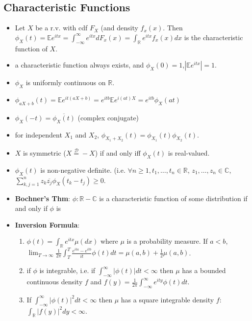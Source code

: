 \documentclass[11pt]{article}
\newcommand{\bbr}{\mathbb{R}}
\newcommand{\gf}{\phi}
\newcommand\abs[1]{\left|#1\right|}
\renewcommand{\to}{\longrightarrow}
\newcommand{\eqd}{\overset{\mathcal{D}}{=}}
\newcommand{\E}{\mathbb{E}}
\newcommand{\gm}{\mu}
\begin{document}
\begin{multicols}{2}
\subsection{Characteristic Functions}
\begin{itemize}
\item Let $X$ be a r.v. with cdf $F_{X}$ (and density $f_x(x)$.  Then $\gf_{X}(t)=\E e^{itx}=\int_{-\infty}^\infty e^{itx} dF_x(x)=\int_{\bbr}e^{itx}f_x(x)dx$ is the characteristic function of $X$.
\item a characteristic function always exists, and $\gf_X(0)=1$,$\abs{ \E e^{itx}}=1$.
\item $\gf_X$ is uniformly continuous on $\bbr$.
\item $\gf_{aX+b}(t) = \E e^{it(aX+b)} = e^{itb} \E e^{i(at)X} = e^{itb} \gf_X(at)$
\item $\gf_X(-t) = \overline{\gf_{X}(t)}$ (complex conjugate)
\item for independent $X_1$ and $X_2$, $\gf_{X_1+X_2}(t)=\gf_{X_1}(t) \gf_{X_2}(t)$.
\item $X$ is symmetric ($X \eqd -X$) if and only iff $\gf_X(t)$ is real-valued.
\item $\gf_X(t)$ is non-negative definite. (i.e. $\forall n \geq 1, t_1, \ldots, t_n \in \bbr$, $z_1, \ldots, z_n \in \mathbb{C}$, $\sum_{k,j=1}^n z_k\overline{z_j} \gf_X(t_k-t_j) \geq 0$.
\item \textbf{Bochner's Thm}: $\gf: \bbr - \mathbb{C}$ is a characteristic function of some distribution if and only if $\gf$ is 
\item \textbf{Inversion Formula}:
\begin{enumerate}
\item $\gf(t) = \int_\bbr e^{itx} \mu(dx)$ where $\mu$ is a probability measure.  If $a<b$, $\lim_{T \to \infty} \frac{1}{2\pi} \int_{T}^T \frac{e^{ita}-e^{itb}}{it}\gf(t)dt = \mu(a,b)+\frac{1}{2}\gm({a,b})$.
\item if $\gf$ is integrable, i.e. if $\int_{-\infty}^\infty \abs{\gf(t)}dt < \infty$ then $\gm$ has a bounded continuous density $f$ and $f(y)=\frac{1}{2 \pi} \int_{-\infty}^\infty e^{ity}\gf(t) dt$.
\item If $\int_{-\infty}^\infty \abs{\gf(t)}^2 dt < \infty$ then $\gm$ has a square integrable density $f$: $\int_\bbr \abs{f(y)}^2 dy <\infty$.

\end{enumerate}
\end{itemize}
\end{multicols}
\end{document}
